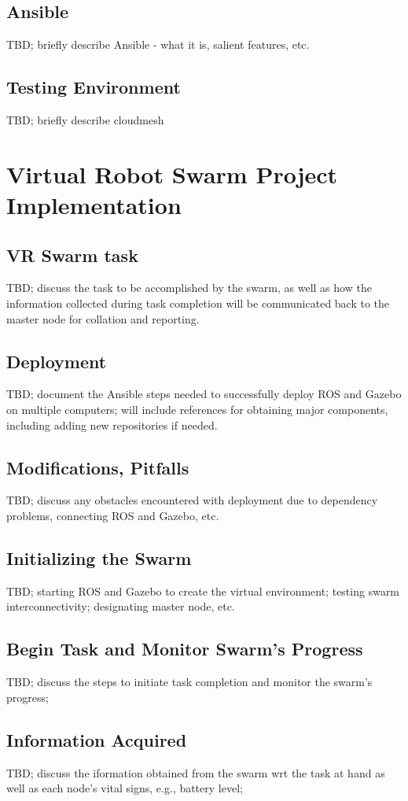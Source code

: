 \documentclass[9pt,twocolumn,twoside]{styles/osajnl}
\begin{document}
\subsection{Ansible}
TBD; briefly describe Ansible - what it is, salient features, etc.
\subsection{Testing Environment}
TBD; briefly describe cloudmesh


\section{Virtual Robot Swarm Project Implementation}
\subsection{VR Swarm task}
TBD; discuss the task to be accomplished by the swarm, as well as how the information collected during task completion will be communicated back to the master node for collation and reporting.
\subsection{Deployment}
TBD; document the Ansible steps needed to successfully deploy ROS and Gazebo on multiple computers;  will include references for obtaining major components, including adding new repositories if needed.
\subsection{Modifications, Pitfalls}
TBD; discuss any obstacles encountered with deployment due to dependency problems, connecting ROS and Gazebo, etc.
\subsection{Initializing the Swarm}
TBD; starting ROS and Gazebo to create the virtual environment; testing swarm interconnectivity; designating master node, etc.
\subsection{Begin Task and Monitor Swarm's Progress}
TBD; discuss the steps to initiate task completion and monitor the swarm's progress;
\subsection{Information Acquired}
TBD; discuss the iformation obtained from the swarm wrt the task at hand as well as each node's vital signs, e.g., battery level;
\end{document}
